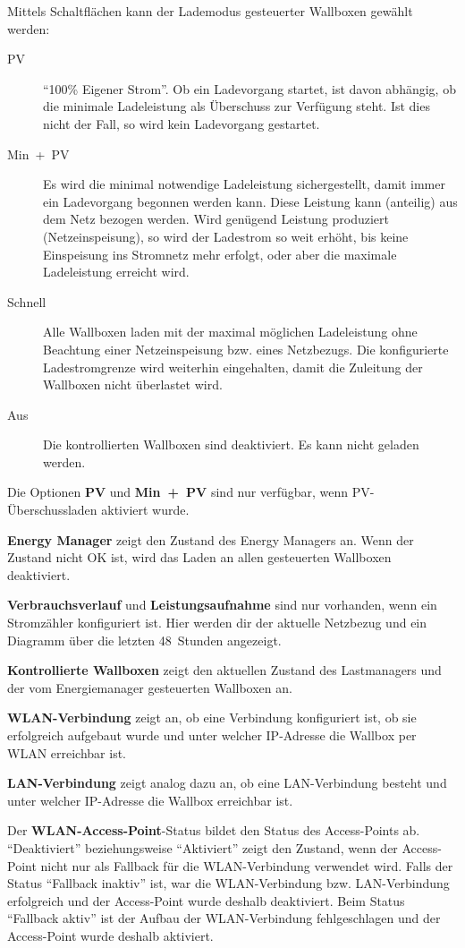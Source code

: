 \documentclass[a4paper,10pt]{article}
\begin{document}
\begin{multicols*}{2}
	Mittels Schaltflächen kann der Lademodus gesteuerter
	Wallboxen gewählt werden:
	\begin{description}
	\item[PV] \enquote{100\% Eigener Strom}. Ob ein
	Ladevorgang startet, ist davon abhängig, ob die minimale Ladeleistung
	als Überschuss zur Verfügung steht. Ist dies nicht der Fall, so
	wird kein Ladevorgang gestartet.
	\item[Min~+~PV] Es wird die minimal notwendige Ladeleistung sichergestellt, damit immer ein Ladevorgang begonnen werden kann. Diese Leistung kann (anteilig) aus dem Netz bezogen werden. Wird genügend Leistung produziert (Netzeinspeisung), so wird
	der Ladestrom so weit erhöht, bis keine Einspeisung ins Stromnetz mehr
	erfolgt, oder aber die maximale Ladeleistung erreicht wird.
	\item[Schnell] Alle Wallboxen laden mit der maximal möglichen
	Ladeleistung ohne Beachtung einer Netzeinspeisung bzw. eines Netzbezugs. Die konfigurierte Ladestromgrenze wird weiterhin eingehalten, damit die Zuleitung der Wallboxen nicht überlastet wird.
	\item[Aus] Die kontrollierten Wallboxen sind deaktiviert. Es kann
	nicht geladen werden.
	\end{description}
	Die Optionen \textbf{PV} und \textbf{Min~+~PV} sind nur verfügbar, wenn PV-Überschussladen aktiviert wurde.

	\textbf{Energy Manager} zeigt den Zustand des Energy Managers an. Wenn der Zustand nicht OK ist, wird das Laden an allen gesteuerten Wallboxen deaktiviert.

	\textbf{Verbrauchsverlauf} und \textbf{Leistungsaufnahme} sind nur vorhanden, wenn ein Stromzähler konfiguriert ist.
	Hier werden dir der aktuelle Netzbezug und ein Diagramm über
	die letzten 48~Stunden angezeigt.

	\textbf{Kontrollierte Wallboxen} zeigt den aktuellen Zustand des Lastmanagers und der vom Energiemanager gesteuerten
	Wallboxen an.

	\textbf{WLAN-Verbindung} zeigt an, ob eine Verbindung konfiguriert ist, ob sie erfolgreich aufgebaut wurde und
	unter welcher IP-Adresse die Wallbox per WLAN erreichbar ist.

	\textbf{LAN-Verbindung} zeigt analog dazu an, ob eine LAN-Verbindung besteht und unter welcher IP-Adresse die Wallbox erreichbar ist.

	Der \textbf{WLAN-Access-Point}-Status bildet den Status des Access-Points ab.
	\enquote{Deaktiviert} beziehungsweise \enquote{Aktiviert} zeigt den Zustand, wenn der Access-Point nicht
	nur als Fallback für die WLAN-Verbindung verwendet wird. Falls der Status \enquote{Fallback inaktiv} ist,
	war die WLAN-Verbindung bzw. LAN-Verbindung erfolgreich und der Access-Point wurde deshalb deaktiviert.
	Beim Status \enquote{Fallback aktiv} ist der Aufbau der WLAN-Verbindung fehlgeschlagen und der
	Access-Point wurde deshalb aktiviert.


\end{multicols*}
\end{document}
